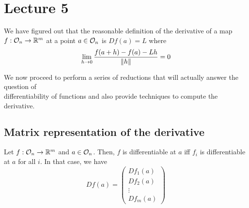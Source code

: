 \documentclass[../Analysis-3.tex]{subfiles}
\begin{document}
\chapter*{Lecture 5} %
\setcounter{chapter}{5} %
\setcounter{section}{0}
\setcounter{equation}{0}
\setcounter{figure}{0}


We have figured out that the reasonable definition of the derivative of a map $ f: \mathcal{O}_{n} \to \mathbb{R}^m $ at a point $ a \in \mathcal{O}_{n} $ is $ Df(a) = L $ where
\[ \lim_{h \to 0}  \frac{f(a+h)-f(a)-Lh}{\norm{h}} = 0 \]

We now proceed to perform a series of reductions that will actually answer the question of \\
differentiability of functions and also provide techniques to compute the derivative.

\section{Matrix representation of the derivative}

\begin{Thm}{}{}
  Let $ f: \mathcal{O}_{n} \to \mathbb{R}^m $ and $ a \in \mathcal{O}_{n} $. Then, $ f $ is differentiable at $ a $ iff $ f_i $ is differentiable at $ a $ for all $ i $. In that case, we have
  \[ Df(a) =
    \begin{pmatrix}
      Df_1(a) \\
      Df_2(a) \\
      \vdots  \\
      Df_m(a)
    \end{pmatrix} \]
\end{Thm}
\end{document}
